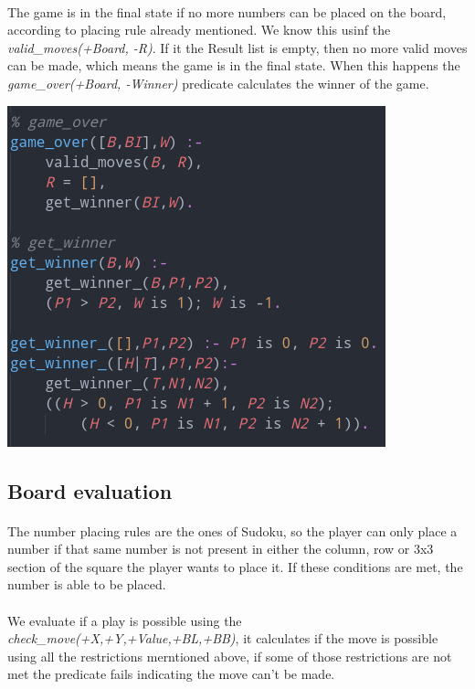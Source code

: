 \documentclass[a4paper]{article}
\begin{document}
\paragraph{}
The game is in the final state if no more numbers can be placed on the board, according to placing rule already 
mentioned. We know this usinf the \textit{valid\_moves(+Board, -R)}. If it the Result list is empty, then no more valid
moves can be made, which means the game is in the final state. When this happens the \textit{game\_over(+Board, -Winner)}
predicate calculates the winner of the game.

\begin{center}
    \includegraphics[scale=0.4]{img/game_over.png}
\end{center}

\subsection{Board evaluation}
\paragraph{}
The number placing rules are the ones of Sudoku, so the player can only place a number if that same number is not present
in either the column, row or 3x3 section of the square the player wants to place it. If these conditions are met, 
the number is able to be placed.

\paragraph{}
We evaluate if a play is possible using the \textit{check\_move(+X,+Y,+Value,+BL,+BB)}, it calculates if the move is possible using 
all the restrictions merntioned  above, if some of those restrictions are not met the predicate fails indicating the move can't be made.
\end{document}
